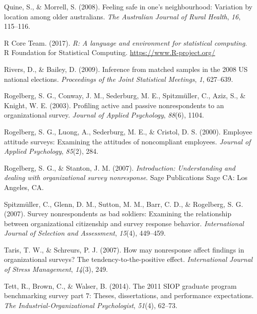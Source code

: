 \documentclass[
  man,floatsintext]{apa7}
\newlength{\cslhangindent}
\newlength{\cslentryspacingunit} %
\newenvironment{CSLReferences}[2] %
 {%
  \setlength{\parindent}{0pt}
  \ifodd #1
  \let\oldpar\par
  \def\par{\hangindent=\cslhangindent\oldpar}
  \fi
  \setlength{\parskip}{#2\cslentryspacingunit}
 }%
 {}
\begin{document}
\begin{CSLReferences}{1}{0}
\leavevmode{}%
Quine, S., \& Morrell, S. (2008). Feeling safe in one's neighbourhood: Variation by location among older australians. \emph{The Australian Journal of Rural Health}, \emph{16}, 115--116.

\leavevmode{}%
R Core Team. (2017). \emph{R: A language and environment for statistical computing}. R Foundation for Statistical Computing. \url{https://www.R-project.org/}

\leavevmode{}%
Rivers, D., \& Bailey, D. (2009). Inference from matched samples in the 2008 {US} national elections. \emph{Proceedings of the Joint Statistical Meetings}, \emph{1}, 627--639.

\leavevmode{}%
Rogelberg, S. G., Conway, J. M., Sederburg, M. E., Spitzmüller, C., Aziz, S., \& Knight, W. E. (2003). Profiling active and passive nonrespondents to an organizational survey. \emph{Journal of Applied Psychology}, \emph{88}(6), 1104.

\leavevmode{}%
Rogelberg, S. G., Luong, A., Sederburg, M. E., \& Cristol, D. S. (2000). Employee attitude surveys: Examining the attitudes of noncompliant employees. \emph{Journal of Applied Psychology}, \emph{85}(2), 284.

\leavevmode{}%
Rogelberg, S. G., \& Stanton, J. M. (2007). \emph{Introduction: Understanding and dealing with organizational survey nonresponse}. Sage Publications Sage {CA}: Los Angeles, {CA}.

\leavevmode{}%
Spitzmüller, C., Glenn, D. M., Sutton, M. M., Barr, C. D., \& Rogelberg, S. G. (2007). Survey nonrespondents as bad soldiers: Examining the relationship between organizational citizenship and survey response behavior. \emph{International Journal of Selection and Assessment}, \emph{15}(4), 449--459.

\leavevmode{}%
Taris, T. W., \& Schreurs, P. J. (2007). How may nonresponse affect findings in organizational surveys? The tendency-to-the-positive effect. \emph{International Journal of Stress Management}, \emph{14}(3), 249.

\leavevmode{}%
Tett, R., Brown, C., \& Walser, B. (2014). The 2011 {SIOP} graduate program benchmarking survey part 7: Theses, dissertations, and performance expectations. \emph{The Industrial-Organizational Psychologist}, \emph{51}(4), 62--73.


\end{CSLReferences}
\end{document}
